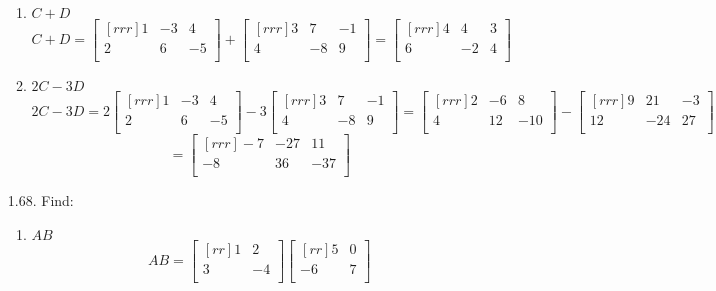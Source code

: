 \documentclass[12pt]{article}
\begin{document}
\begin{enumerate}
\begin{enumerate}
	\item $C+D$
		\[ 	C+D 
			= \begin{bmatrix}[rrr] 1 & -3 & 4\\ 2 & 6 & -5\\ \end{bmatrix}
			+ \begin{bmatrix}[rrr] 3 & 7 & -1\\ 4 & -8 & 9\\ \end{bmatrix}
			= \begin{bmatrix}[rrr] 4 & 4 & 3\\  6 & -2 & 4\\ \end{bmatrix} \]	
	
	\item $2C-3D$
		\[ 	2C-3D
			= 2 \begin{bmatrix}[rrr] 1 & -3 & 4\\ 2 & 6 & -5\\ \end{bmatrix}
			- 3 \begin{bmatrix}[rrr] 3 & 7 & -1\\ 4 & -8 & 9\\ \end{bmatrix}
			= \begin{bmatrix}[rrr] 2 & -6 & 8\\ 4 & 12 & -10\\ \end{bmatrix}
			- \begin{bmatrix}[rrr] 9 & 21 & -3\\ 12 & -24 & 27\\ \end{bmatrix} \]
			\[ = \begin{bmatrix}[rrr] -7 & -27 & 11\\ -8 & 36 & -37\\ \end{bmatrix} \]
	\end{enumerate}
\item[1.68.] Find:
	\begin{enumerate}
	\item $AB$
		\[ 	AB
			= \begin{bmatrix}[rr] 1 & 2\\ 3 & -4\\ \end{bmatrix}
			\begin{bmatrix}[rr] 5 & 0\\ -6 & 7\\ \end{bmatrix}
\]
\end{enumerate}
\end{enumerate}
\end{document}
